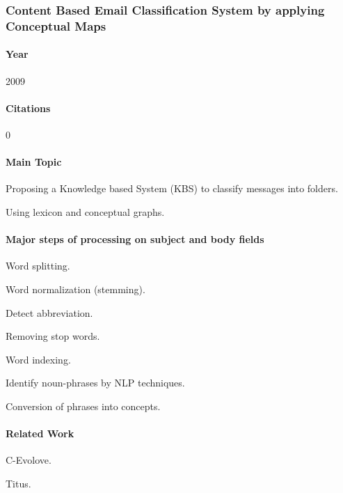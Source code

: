 \documentclass[12pt]{article}
\newenvironment{my_itemize}
{\begin{itemize}
  \setlength{\itemsep}{0cm}
  \setlength{\parskip}{0cm}}
{\end{itemize}}
\begin{document}
\subsubsection{Content Based Email Classification System by applying Conceptual Maps \cite{BASKARAN09}}

\paragraph{Year} 2009
\paragraph{Citations} 0

\paragraph{Main Topic}
\begin{my_itemize}
    \item Proposing a Knowledge based System (KBS) to classify messages into folders.
    \item Using lexicon and conceptual graphs.
\end{my_itemize}

\paragraph{Major steps of processing on subject and body fields}
\begin{my_itemize}
    \item Word splitting.
    \item Word normalization (stemming).
    \item Detect abbreviation.
    \item Removing stop words.
    \item Word indexing.
    \item Identify noun-phrases by NLP techniques.
    \item Conversion of phrases into concepts.
\end{my_itemize}

\paragraph{Related Work}
\begin{my_itemize}
    \item C-Evolove.
    \item Titus.
\end{my_itemize}
\end{document}
